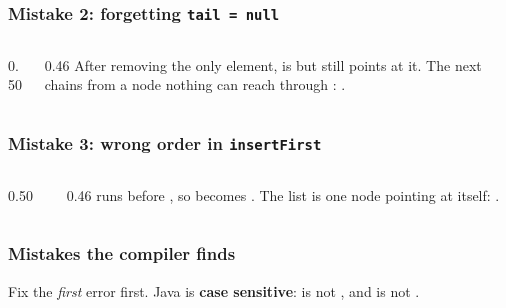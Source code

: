 \documentclass[aspectratio=169,10pt,compress]{beamer}
\begin{document}
\begin{frame}[t,fragile] \frametitle{Mistake 2: forgetting \texttt{tail = null}}
  \begin{columns}[T]
    \begin{column}{0.50\textwidth}
    \end{column}
    \begin{column}{0.46\textwidth}
      \small
      After removing the only element,  is  but
       still points at it. The next  chains
      from a node nothing can reach through :
      .
    \end{column}
  \end{columns}
\end{frame}




\begin{frame}[t,fragile] \frametitle{Mistake 3: wrong order in \texttt{insertFirst}}
  \begin{columns}[T]
    \begin{column}{0.50\textwidth}
    \end{column}
    \begin{column}{0.46\textwidth}
      \small
       runs before , so
       becomes . The list is one node pointing
      at itself: .
    \end{column}
  \end{columns}
\end{frame}




\begin{frame}[t,fragile] \frametitle{Mistakes the compiler finds}
  \vspace{0.2em}
  \small
  Fix the \emph{first} error first. Java is \textbf{case sensitive}:
   is not , and 
  is not .
\end{frame}
\end{document}
